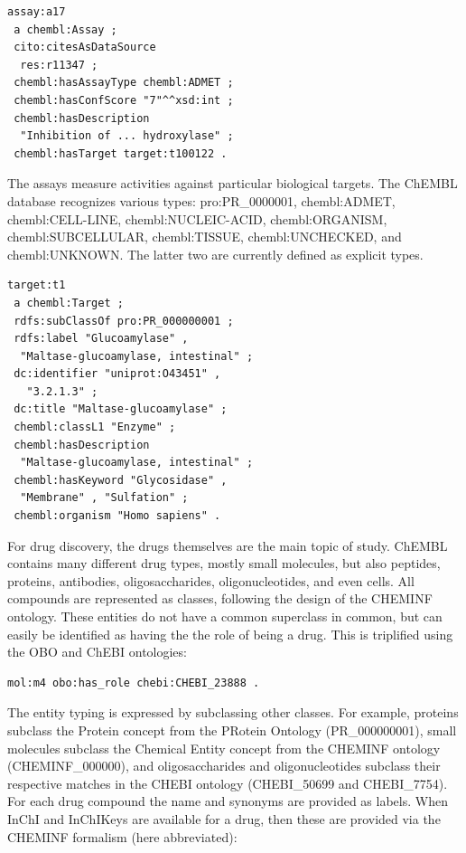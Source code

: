 \documentclass[10pt]{bmc_article}
\newenvironment{bmcformat}{\begin{raggedright}\baselineskip20pt\sloppy\setboolean{publ}{false}}{\end{raggedright}\baselineskip20pt\sloppy}
\begin{document}
\begin{bmcformat}
\begin{small}
\begin{verbatim}
assay:a17
 a chembl:Assay ;
 cito:citesAsDataSource
  res:r11347 ;
 chembl:hasAssayType chembl:ADMET ;
 chembl:hasConfScore "7"^^xsd:int ;
 chembl:hasDescription
  "Inhibition of ... hydroxylase" ;
 chembl:hasTarget target:t100122 .
\end{verbatim}
\end{small}

The assays measure activities against particular biological targets. The ChEMBL database
recognizes various types: pro:PR\_0000001, chembl:ADMET, chembl:CELL-LINE,
chembl:NUCLEIC-ACID, chembl:ORGANISM, chembl:SUBCELLULAR, chembl:TISSUE,
chembl:UNCHECKED, and chembl:UNKNOWN. The latter two are currently defined as
explicit types.

\begin{small}
\begin{verbatim}
target:t1
 a chembl:Target ;
 rdfs:subClassOf pro:PR_000000001 ;
 rdfs:label "Glucoamylase" , 
  "Maltase-glucoamylase, intestinal" ;
 dc:identifier "uniprot:O43451" ,
   "3.2.1.3" ;
 dc:title "Maltase-glucoamylase" ;
 chembl:classL1 "Enzyme" ;
 chembl:hasDescription
  "Maltase-glucoamylase, intestinal" ;
 chembl:hasKeyword "Glycosidase" , 
  "Membrane" , "Sulfation" ;
 chembl:organism "Homo sapiens" .
\end{verbatim}
\end{small}

For drug discovery, the drugs themselves are the main topic of study.
ChEMBL contains many different drug types, mostly small molecules,
but also peptides, proteins, antibodies, oligosaccharides, oligonucleotides, and
even cells. All compounds are represented as classes, following
the design of the CHEMINF ontology. These entities do not have a common
superclass in common, but can easily be identified as having the 
the role of being a drug. This is triplified using the OBO and ChEBI
ontologies:

\begin{small}
\begin{verbatim}
mol:m4 obo:has_role chebi:CHEBI_23888 .
\end{verbatim}
\end{small}

The entity typing is expressed
by subclassing other classes. For example, proteins subclass the
Protein concept from the PRotein Ontology (PR\_000000001), small
molecules subclass the Chemical Entity concept from the CHEMINF
ontology (CHEMINF\_000000), and oligosaccharides and oligonucleotides
subclass their respective matches in the CHEBI ontology (CHEBI\_50699
and CHEBI\_7754). For each drug compound the name and synonyms are
provided as labels. When InChI and InChIKeys are available for a drug, then these are
provided via the CHEMINF formalism (here abbreviated):


\end{bmcformat}
\end{document}

